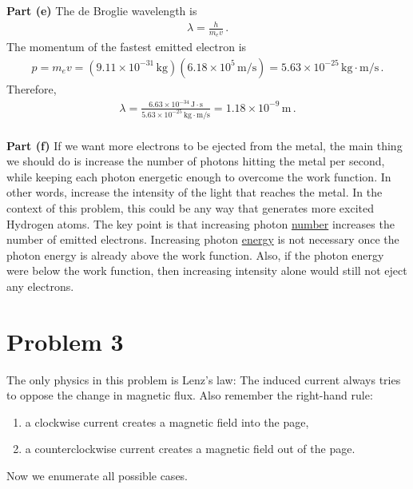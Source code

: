 \documentclass[11pt]{article}
\begin{document}
\noindent\textbf{Part (e)} The de Broglie wavelength is
\begin{align*}
\lambda = \frac{h}{m_ev}\,.
\end{align*}
The momentum of the fastest emitted electron is
\begin{align*}
p = m_ev = (9.11\times 10^{-31}\,\text{kg})(6.18\times 10^5\,\text{m/s})
= 5.63\times 10^{-25}\,\text{kg}\cdot\text{m/s}\,.
\end{align*}
Therefore,
\begin{align*}
\lambda = \frac{6.63\times 10^{-34}\,\text{J}\cdot\text{s}}{5.63\times 10^{-25}\,\text{kg}\cdot\text{m/s}}
= 1.18\times 10^{-9}\,\text{m}\,.\\
\end{align*}


\noindent\textbf{Part (f)} If we want more electrons to be ejected from the metal, the main thing we should do is increase the number of photons hitting the metal per second, while keeping each photon energetic enough to overcome the work function. In other words, increase the intensity of the light that reaches the metal. In the context of this problem, this could be any way that generates more excited Hydrogen atoms. The key point is that increasing photon \underline{number} increases the number of emitted electrons. Increasing photon \underline{energy} is not necessary once the photon energy is already above the work function. Also, if the photon energy were below the work function, then increasing intensity alone would still not eject any electrons.\\

\section*{Problem 3}
The only physics in this problem is Lenz's law: The induced current always tries to {oppose the change} in magnetic flux. Also remember the right-hand rule:
\begin{enumerate}
\item a clockwise current creates a magnetic field {into the page},
\item a counterclockwise current creates a magnetic field {out of the page}.
\end{enumerate}
Now we enumerate all possible cases.\\
\end{document}
